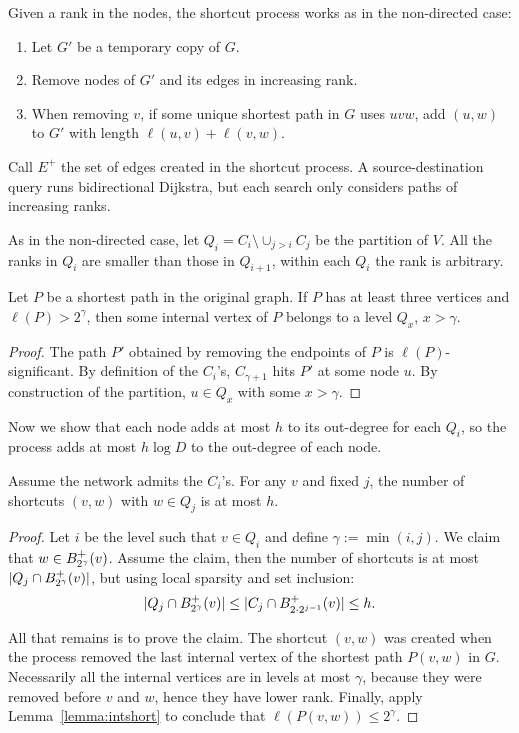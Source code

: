 Given a rank in the nodes, the shortcut process works as in the non-directed case:
\begin{enumerate}
	\item Let $G'$ be a temporary copy of $G$.
	\item Remove nodes of $G'$ and its edges in increasing rank.
	\item When removing $v$, if some unique shortest path in $G$ uses $uvw$, add $(u,w)$ to $G'$ with length $\ell(u,v)+\ell(v,w)$.
\end{enumerate}

Call $E^+$ the set of edges created in the shortcut process.
A source-destination query runs bidirectional Dijkstra, but each search only considers paths of increasing ranks.

As in the non-directed case, let $Q_i=C_i\setminus \cup_{j>i}C_j$ be the partition of $V$.
All the ranks in $Q_i$ are smaller than those in $Q_{i+1}$, within each $Q_i$ the rank is arbitrary.

\begin{lemma}\label{lemma:intshort}
	Let $P$ be a shortest path in the original graph.
	If $P$ has at least three vertices and $\ell(P)>2^{\gamma}$, then some internal vertex of $P$ belongs to a level $Q_x$, $x>\gamma$.
\end{lemma}
\begin{proof}
	The path $P'$ obtained by removing the endpoints of $P$ is $\ell(P)$-significant.
	By definition of the $C_i$'s, $C_{\gamma+1}$ hits $P'$ at some node $u$.
	By construction of the partition, $u\in Q_x$ with some $x>\gamma$. 
\end{proof}

Now we show that each node adds at most $h$ to its out-degree for each $Q_i$, so the process adds at most $h\log D$ to the out-degree of each node.
\begin{lemma}
	Assume the network admits the $C_i$'s.
	For any $v$ and fixed $j$, the number of shortcuts $(v,w)$ with $w\in Q_j$ is at most $h$.
\end{lemma}
\begin{proof}
	Let $i$ be the level such that $v\in Q_i$ and define $\gamma:=\min(i,j)$.
	We claim that $w\in B^+_{2^\gamma}(v)$.
	Assume the claim, then the number of shortcuts is at most $\lvert Q_j\cap B^+_{2^\gamma}(v)\rvert$, but using local sparsity and set inclusion:
	\[
	\lvert Q_j\cap B^+_{2^\gamma}(v)\rvert\leq \lvert C_j\cap B^+_{2\cdot 2^{j-1}}(v)\rvert \leq h.
	\]
	
	All that remains is to prove the claim.
	The shortcut $(v,w)$ was created when the process removed the last internal vertex of the shortest path $P(v,w)$ in $G$.
	Necessarily all the internal vertices are in levels at most $\gamma$, because they were removed before $v$ and $w$, hence they have lower rank.
	Finally, apply Lemma~\ref{lemma:intshort} to conclude that $\ell(P(v,w))\leq 2^\gamma$.
\end{proof}

